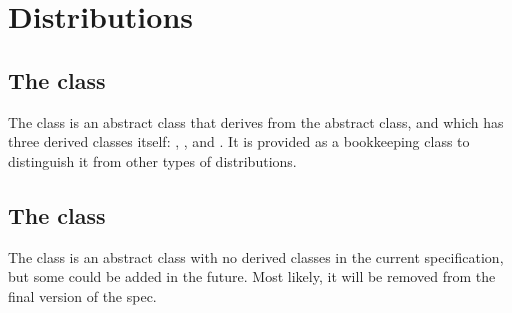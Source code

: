 
\section{Distributions}
\label{apdx-distributions}

\subsection{The  class}
\label{UnivariateDistribution-class}
\label{univariatedistribution-class}

The \UnivariateDistribution class is an abstract class that derives from the \Distribution abstract class, and which has three derived classes itself: \ContinuousUnivariateDistribution, \DiscreteUnivariateDistribution, and \CategoricalUnivariateDistribution.  It is provided as a bookkeeping class to distinguish it from other types of distributions.


\subsection{The  class}
\label{MultivariateDistribution-class}
\label{multivariatedistribution-class}

The \MultivariateDistribution class is an abstract class with no derived classes in the current specification, but some could be added in the future.  Most likely, it will be removed from the final version of the spec.


